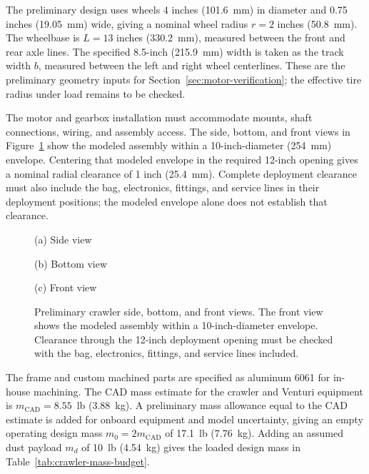 The preliminary design uses wheels 4 inches (101.6~mm) in diameter and 0.75 inches (19.05~mm) wide, giving a nominal wheel radius $r=2$ inches (50.8~mm). The wheelbase is $L=13$ inches (330.2~mm), measured between the front and rear axle lines. The specified 8.5-inch (215.9~mm) width is taken as the track width $b$, measured between the left and right wheel centerlines. These are the preliminary geometry inputs for Section~\ref{sec:motor-verification}; the effective tire radius under load remains to be checked.

The motor and gearbox installation must accommodate mounts, shaft connections, wiring, and assembly access. The side, bottom, and front views in Figure~\ref{fig:crawler-envelope-cad} show the modeled assembly within a 10-inch-diameter (254~mm) envelope. Centering that modeled envelope in the required 12-inch opening gives a nominal radial clearance of 1 inch (25.4~mm). Complete deployment clearance must also include the bag, electronics, fittings, and service lines in their deployment positions; the modeled envelope alone does not establish that clearance.
\begin{figure}[p]
\centering
\begingroup\singlespacing
{}\par
{\small (a) Side view}\par\medskip
{}\par
{\small (b) Bottom view}\par\medskip
{}\par
{\small (c) Front view}\par
\endgroup
\caption[Preliminary crawler side, bottom, and front views]{Preliminary crawler side, bottom, and front views. The front view shows the modeled assembly within a 10-inch-diameter envelope. Clearance through the 12-inch deployment opening must be checked with the bag, electronics, fittings, and service lines included.}
\label{fig:crawler-envelope-cad}
\end{figure}

The frame and custom machined parts are specified as aluminum 6061 for in-house machining. The CAD mass estimate for the crawler and Venturi equipment is $m_{\mathrm{CAD}}=8.55$~lb (3.88~kg). A preliminary mass allowance equal to the CAD estimate is added for onboard equipment and model uncertainty, giving an empty operating design mass $m_0=2m_{\mathrm{CAD}}$ of 17.1~lb (7.76~kg). Adding an assumed dust payload $m_d$ of 10~lb (4.54~kg) gives the loaded design mass in Table~\ref{tab:crawler-mass-budget}.

